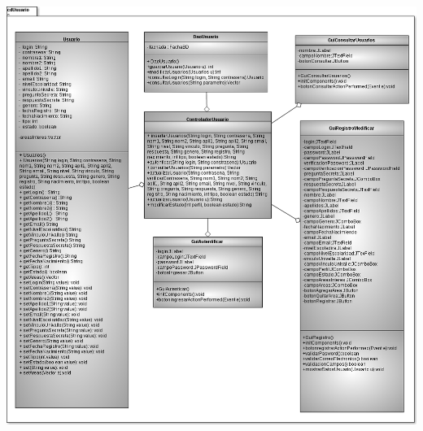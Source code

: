 \documentclass[]{article}
\begin{document}
			\begin{minipage}[c]{1\linewidth}
				\centering
				\includegraphics[width=17cm, height=22cm]{DiagramasClase/Usuarios}
			\end{minipage}	
		
\end{document}
